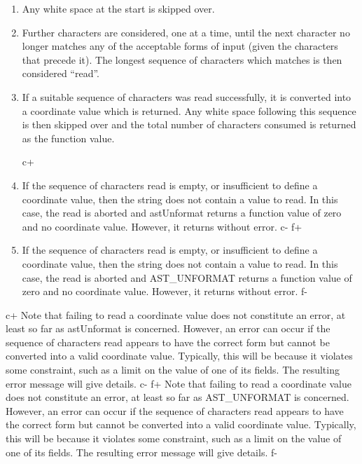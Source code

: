 \documentclass[twoside,11pt]{article}
\begin{document}
\begin{enumerate}
\item Any white space at the start is skipped over.

\item Further characters are considered, one at a time, until the next
character no longer matches any of the acceptable forms of input
(given the characters that precede it). The longest sequence of
characters which matches is then considered ``read''.

\item If a suitable sequence of characters was read successfully, it
is converted into a coordinate value which is returned. Any white
space following this sequence is then skipped over and the total
number of characters consumed is returned as the function value.

c+
\item If the sequence of characters read is empty, or insufficient to
define a coordinate value, then the string does not contain a value to
read. In this case, the read is aborted and astUnformat returns a
function value of zero and no coordinate value.  However, it returns
without error.
c-
f+
\item If the sequence of characters read is empty, or insufficient to
define a coordinate value, then the string does not contain a value to
read. In this case, the read is aborted and AST\_UNFORMAT returns a
function value of zero and no coordinate value. However, it returns
without error.
f-
\end{enumerate}

c+
Note that failing to read a coordinate value does not constitute an
error, at least so far as astUnformat is concerned. However, an error
can occur if the sequence of characters read appears to have the
correct form but cannot be converted into a valid coordinate
value. Typically, this will be because it violates some constraint,
such as a limit on the value of one of its fields. The resulting error
message will give details.
c-
f+
Note that failing to read a coordinate value does not constitute an
error, at least so far as AST\_UNFORMAT is concerned. However, an
error can occur if the sequence of characters read appears to have the
correct form but cannot be converted into a valid coordinate
value. Typically, this will be because it violates some constraint,
such as a limit on the value of one of its fields. The resulting error
message will give details.
f-
\end{document}
